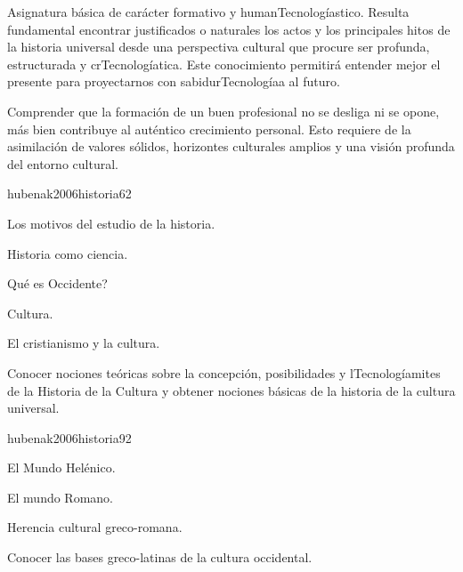 \begin{syllabus}


\begin{justification}
Asignatura básica de carácter formativo y humanTecnologíastico. Resulta fundamental encontrar justificados o naturales los actos y los principales hitos de la historia universal desde una perspectiva cultural que procure ser profunda, estructurada y crTecnologíatica. Este conocimiento permitirá entender mejor el presente para proyectarnos con sabidurTecnologíaa al futuro.
\end{justification}

\begin{goals}
\item Comprender que la formación de un buen profesional no se desliga ni se opone, más bien contribuye al auténtico crecimiento personal. Esto requiere de la asimilación de valores sólidos, horizontes culturales amplios y una visión profunda del entorno cultural.
\end{goals}

\begin{outcomes}
\end{outcomes}

\begin{unit}{}{hubenak2006historia}{6}{2}
\begin{topics}
	\item Los motivos del estudio de la historia. 	
	\item Historia como ciencia. 	
	\item Qué es Occidente? 	
	\item Cultura. 	
	\item El cristianismo y la cultura. 
\end{topics}
\begin{learningoutcomes}
	\item Conocer nociones teóricas sobre la concepción, posibilidades y lTecnologíamites de la Historia de la Cultura y obtener nociones básicas de la historia de la cultura universal.
\end{learningoutcomes}
\end{unit}

\begin{unit}{}{hubenak2006historia}{9}{2}
\begin{topics}
	\item El Mundo Helénico. 	
	\item El mundo Romano. 	
	\item Herencia cultural greco-romana. 
\end{topics}
\begin{learningoutcomes}
	\item Conocer las bases greco-latinas de la cultura occidental.
\end{learningoutcomes}
\end{unit}


\end{syllabus}
